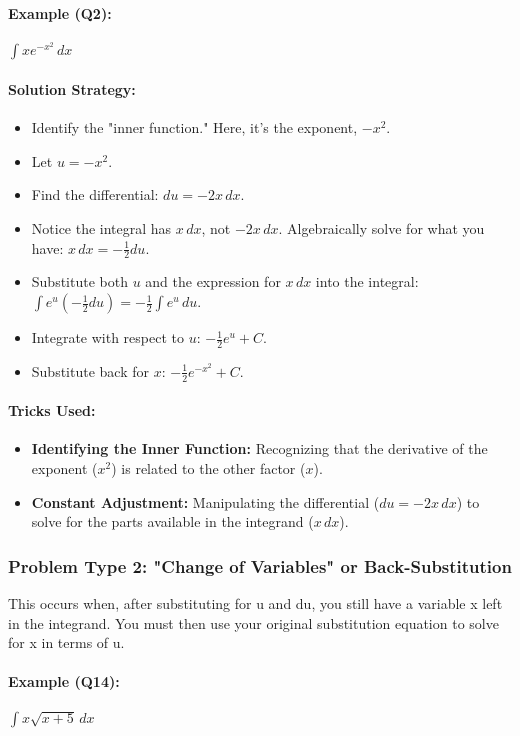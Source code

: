 \documentclass{article}
\begin{document}
\paragraph{Example (Q2):} $ \int xe^{-x^2} \,dx $
\paragraph{Solution Strategy:}
\begin{itemize}
    \item Identify the "inner function." Here, it's the exponent, $-x^2$.
    \item Let $u = -x^2$.
    \item Find the differential: $du = -2x \,dx$.
    \item Notice the integral has $x \,dx$, not $-2x \,dx$. Algebraically solve for what you have: $x \,dx = -\frac{1}{2}du$.
    \item Substitute both $u$ and the expression for $x \,dx$ into the integral: $ \int e^u (-\frac{1}{2}du) = -\frac{1}{2} \int e^u \,du $.
    \item Integrate with respect to $u$: $-\frac{1}{2}e^u + C$.
    \item Substitute back for $x$: $-\frac{1}{2}e^{-x^2} + C$.
\end{itemize}
\paragraph{Tricks Used:}
\begin{itemize}
    \item \textbf{Identifying the Inner Function:} Recognizing that the derivative of the exponent ($x^2$) is related to the other factor ($x$).
    \item \textbf{Constant Adjustment:} Manipulating the differential ($du = -2x \,dx$) to solve for the parts available in the integrand ($x \,dx$).
\end{itemize}

\subsubsection{Problem Type 2: "Change of Variables" or Back-Substitution}
This occurs when, after substituting for u and du, you still have a variable x left in the integrand. You must then use your original substitution equation to solve for x in terms of u.
\paragraph{Example (Q14):} $ \int x\sqrt{x+5} \,dx $
\end{document}
